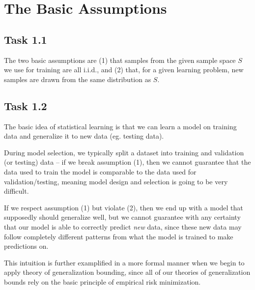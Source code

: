 \section{The Basic Assumptions}
\subsection{Task 1.1}

The two basic assumptions are (1) that samples from the given sample space $S$
we use for training are all i.i.d., and (2) that, for a given learning problem,
new samples are drawn from the same distribution as $S$.

\subsection{Task 1.2}

The basic idea of statistical learning is that we can learn a model on training
data and generalize it to new data (eg. testing data).

During model selection, we typically split a dataset into training and
validation (or testing) data -- if we break assumption (1), then we cannot
guarantee that the data used to train the model is comparable to the data used
for validation/testing, meaning model design and selection is going to be very
difficult.

If we respect assumption (1) but violate (2), then we end up with a model that
supposedly should generalize well, but we cannot guarantee with any certainty
that our model is able to correctly predict \textit{new} data, since these new
data may follow completely different patterns from what the model is trained to
make predictions on.

This intuition is further examplified in a more formal manner when we begin to
apply theory of generalization bounding, since all of our theories of
generalization bounds rely on the basic principle of empirical risk
minimization.

\sectend
